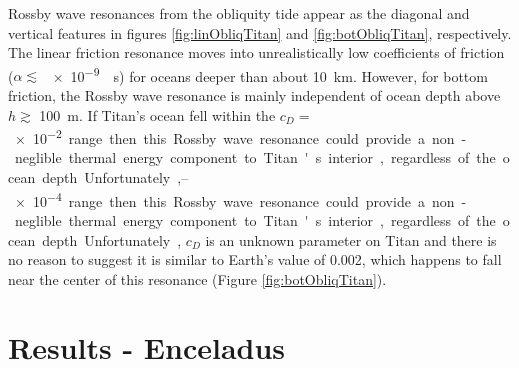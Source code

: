Rossby wave resonances from the obliquity tide appear as the diagonal and vertical features in figures \ref{fig:linObliqTitan} and \ref{fig:botObliqTitan}, respectively. The linear friction resonance moves into unrealistically low coefficients of friction ($\alpha \lesssim$ \SI{e-9}{\per\second}) for oceans deeper than about \SI{10}{\kilo\metre}. However, for bottom friction, the Rossby wave resonance is mainly independent of ocean depth above $h \gtrsim$ \SI{100}{\metre}. If Titan's ocean fell within the $c_D =$ \SIrange{e-2}{e-4} range then this Rossby wave resonance could provide a non-neglible thermal energy component to Titan's interior, regardless of the ocean depth. Unfortunately, $c_D$ is an unknown parameter on Titan and there is no reason to suggest it is similar to Earth's value of \num{0.002}, which happens to fall near the center of this resonance (Figure \ref{fig:botObliqTitan}).

\section{Results - Enceladus \label{sec:results_Enceladus}}

